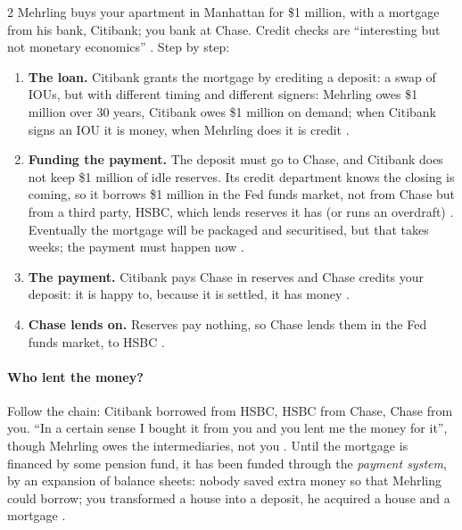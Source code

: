 \begin{paracol}{2}
Mehrling buys your apartment in Manhattan for \$1 million, with a mortgage from his bank, Citibank; you bank at Chase. Credit checks are ``interesting but not
monetary economics'' . Step by step:
\begin{enumerate}
  \item \textbf{The loan.} Citibank grants the mortgage by crediting a deposit: a swap of IOUs, but with different timing and different signers: Mehrling
        owes \$1 million over 30 years, Citibank owes \$1 million on demand; when Citibank signs an IOU it is money, when Mehrling does it is credit
        .
  \item \textbf{Funding the payment.} The deposit must go to Chase, and Citibank does not keep \$1 million of idle reserves. Its credit department knows the
        closing is coming, so it borrows \$1 million in the Fed funds market, not from Chase but from a third party, HSBC, which lends reserves it has (or
        runs an overdraft) . Eventually the mortgage will be packaged and securitised, but that takes weeks; the
        payment must happen now .
  \item \textbf{The payment.} Citibank pays Chase in reserves and Chase credits your deposit: it is happy to, because it is settled, it has money
        .
  \item \textbf{Chase lends on.} Reserves pay nothing, so Chase lends them in the Fed funds market, to HSBC .
\end{enumerate}
\begin{taccts}
\quad
{}\quad
{}

\medskip
{}\qquad
{}
\end{taccts}

\paragraph{Who lent the money?} Follow the chain: Citibank borrowed from HSBC, HSBC from Chase, Chase from you. ``In a certain sense I bought it from you and you
lent me the money for it'', though Mehrling owes the intermediaries, not you . Until the mortgage is financed by some
pension fund, it has been funded through the \emph{payment system}, by an expansion of balance sheets: nobody saved extra money so that Mehrling could borrow;
you transformed a house into a deposit, he acquired a house and a mortgage .


\end{paracol}

